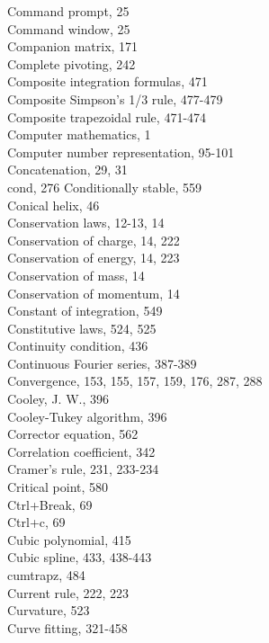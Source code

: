 \documentclass[../main.tex]{subfiles}
\begin{document}
\begin{multicols}{3}
    Command prompt, 25\\
    Command window, 25\\
    Companion matrix, 171\\
    Complete pivoting, 242\\
    Composite integration formulas, 471\\
    Composite Simpson's 1/3 rule, 477-479\\
    Composite trapezoidal rule, 471-474\\
    Computer mathematics, 1\\
    Computer number representation, 95-101\\
    Concatenation, 29, 31\\
    cond, 276
    Conditionally stable, 559\\
    Conical helix, 46\\
    Conservation laws, 12-13, 14\\
    Conservation of charge, 14, 222\\
    Conservation of energy, 14, 223\\
    Conservation of mass, 14\\
    Conservation of momentum, 14\\
    Constant of integration, 549\\
    Constitutive laws, 524, 525\\
    Continuity condition, 436\\
    Continuous Fourier series, 387-389\\
    Convergence, 153, 155, 157, 159, 176, 287, 288\\
    Cooley, J. W., 396\\
    Cooley-Tukey algorithm, 396\\
    Corrector equation, 562\\
    Correlation coefficient, 342\\
    Cramer's rule, 231, 233-234\\
    Critical point, 580\\
    Ctrl+Break, 69\\
    Ctrl+c, 69\\
    Cubic polynomial, 415\\
    Cubic spline, 433, 438-443\\
    cumtrapz, 484\\
    Current rule, 222, 223\\
    Curvature, 523\\
    Curve fitting, 321-458\\

\end{multicols}
\end{document}
